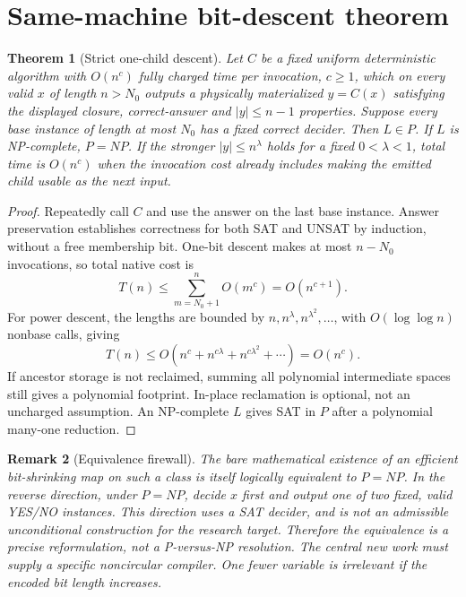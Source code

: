 \documentclass[11pt]{article}
\newtheorem{theorem}{Theorem}
\newtheorem{remark}[theorem]{Remark}
\begin{document}
\section{Same-machine bit-descent theorem}
\begin{theorem}[Strict one-child descent]\label{th:descent}
Let $C$ be a fixed uniform deterministic algorithm with $O(n^c)$ fully charged time per invocation, $c\ge1$, which on every valid $x$ of length $n>N_0$ outputs a physically materialized $y=C(x)$ satisfying the displayed closure, correct-answer and $|y|\le n-1$ properties. Suppose every base instance of length at most $N_0$ has a fixed correct decider. Then $L\in P$. If $L$ is NP-complete, $P=NP$. If the stronger $|y|\le n^\lambda$ holds for a fixed $0<\lambda<1$, total time is $O(n^c)$ when the invocation cost already includes making the emitted child usable as the next input.
\end{theorem}
\begin{proof}
Repeatedly call $C$ and use the answer on the last base instance. Answer preservation establishes correctness for both SAT and UNSAT by induction, without a free membership bit. One-bit descent makes at most $n-N_0$ invocations, so total native cost is
\[
 T(n)\le\sum_{m=N_0+1}^{n}O(m^c)=O(n^{c+1}).
\]
For power descent, the lengths are bounded by $n,n^\lambda,n^{\lambda^2},\ldots$, with $O(\log\log n)$ nonbase calls, giving
\[
 T(n)\le O(n^c+n^{c\lambda}+n^{c\lambda^2}+\cdots)=O(n^c).
\]
If ancestor storage is not reclaimed, summing all polynomial intermediate spaces still gives a polynomial footprint. In-place reclamation is optional, not an uncharged assumption. An NP-complete $L$ gives SAT in $P$ after a polynomial many-one reduction.
\end{proof}
\begin{remark}[Equivalence firewall]
The bare mathematical existence of an efficient bit-shrinking map on such a class is itself logically equivalent to $P=NP$. In the reverse direction, under $P=NP$, decide $x$ first and output one of two fixed, valid YES/NO instances. This direction \emph{uses a SAT decider}, and is not an admissible unconditional construction for the research target. Therefore the equivalence is a precise reformulation, not a P-versus-NP resolution. The central new work must supply a specific noncircular compiler. One fewer variable is irrelevant if the \emph{encoded bit length} increases.
\end{remark}
\end{document}
